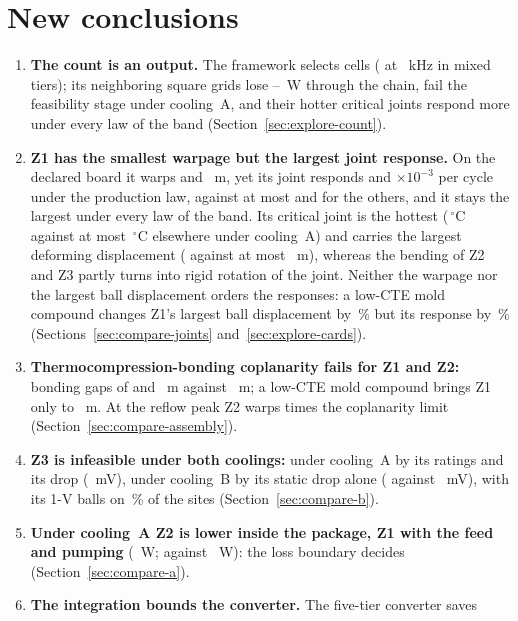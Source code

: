 \documentclass[10pt]{article}
\newcommand{\degC}{\,$^\circ$C}
\newcommand{\cl}[1]{\textbf{#1}\enspace}
\begin{document}
\section*{New conclusions}
\begin{enumerate}
\item \cl{The count is an output.} The framework selects \FrDseOptM{} cells (\FrConvTopo{} at
\FrConvFsw~kHz in \FrDseOptTiersWord{} mixed tiers); its neighboring square grids lose
\FrChainMarginLo--\FrChainMarginHi~W through the chain, fail the feasibility stage under
cooling~A, and their hotter critical joints respond more under every law of the band
(Section~\ref{sec:explore-count}).
\item \cl{Z1 has the smallest warpage but the largest joint response.} On the declared board it
warps \WarpAZone{} and
\WarpBZone~\textmu m, yet its joint responds \MvEpsAZone{} and \MvEpsBZone$\times10^{-3}$ per cycle
under the production law, against at most \MvEpsAZtwo{} and \MvEpsBZthree{} for the others, and it
stays the largest under every law of the band. Its critical joint
is the hottest (\MvTsjAZone\degC{} against at most \MvTsjAZthree\degC{} elsewhere under cooling~A)
and carries the largest deforming displacement (\MvDudefAZone{} against at most
\MvDudefAZthree~\textmu m), whereas the bending of Z2 and Z3 partly turns into rigid rotation of the
joint. Neither the warpage nor the largest ball displacement orders the responses: a low-CTE mold
compound changes Z1's largest ball displacement by \MvEncEmcDuAZone\,\% but its response by
\MvEncEmcEpsAZone\,\% (Sections~\ref{sec:compare-joints} and~\ref{sec:explore-cards}).
\item \cl{Thermocompression-bonding coplanarity fails for Z1 and Z2:} bonding gaps of \MvRfTcbZone{}
and \MvRfTcbZtwo~\textmu m against \MvTcbLim~\textmu m; a low-CTE mold compound brings Z1 only to
\MvRfTcbEmcZone~\textmu m. At the reflow peak Z2 warps \MvRfCoplZtwo{} times the coplanarity limit
(Section~\ref{sec:compare-assembly}).
\item \cl{Z3 is infeasible under both coolings:} under cooling~A by its ratings and its drop
(\VdropAZthree~mV), under cooling~B by its static drop alone (\VdropBZthree{} against
\MthLimDrop~mV), with its 1-V balls on \BgaSiteFracZthree\,\% of the sites
(Section~\ref{sec:compare-b}).
\item \cl{Under cooling~A Z2 is lower inside the package, Z1 with the feed and pumping} (\GapAZtwo~W;
\PlatAZone{} against \PlatAZtwo~W): the loss boundary decides (Section~\ref{sec:compare-a}).
\item \cl{The integration bounds the converter.} The five-tier converter saves

\end{enumerate}
\end{document}
